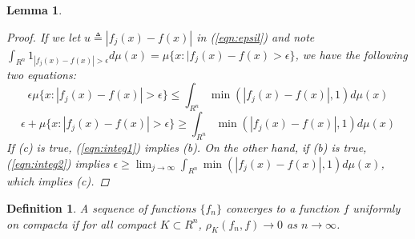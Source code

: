 \documentclass[12pt]{amsart}
\newtheorem{definition}{Definition}
\theoremstyle{plain}
\newtheorem{lemma}[thm]{Lemma}
\theoremstyle{definition}
\theoremstyle{remark}
\numberwithin{equation}{section}
\numberwithin{thm}{section}
\begin{document}
\begin{lemma}
\begin{proof}
If we let $u \triangleq |f_j(x)-f(x)|$ in (\ref{eqn:epsil}) and note $
    \int_{R^n}1_{|f_j(x)-f(x)| > \epsilon} d\mu(x) = \mu\{ x: |f_j(x)-f(x) > \epsilon \}$, we have the following two equations: 
\begin{equation}
    \epsilon\mu \{ x: |f_j(x)-f(x)| > \epsilon \}  \leq \int_{R^n} \min(|f_j(x)-f(x)|,1)d\mu(x) \label{eqn:integ1} 
\end{equation}
\begin{equation}
       \epsilon + \mu \{ x: |f_j(x)-f(x)| > \epsilon \} \geq  \int_{R^n} \min(|f_j(x)-f(x)|,1) d\mu(x) \label{eqn:integ2} 
\end{equation}
If (c) is true, (\ref{eqn:integ1}) implies (b).
On the other hand, if (b) is true, (\ref{eqn:integ2}) implies $\epsilon \geq \lim_{j \to \infty} \int_{R^n} \min(|f_j(x)-f(x)|,1)d\mu(x)$, which implies (c).
\end{proof} 
\end{lemma}


\begin{definition}
    A sequence of functions $\{f_n\}$ converges to a function $f$ uniformly on compacta if for all compact $K \subset R^n$, $\rho_K(f_n,f) \to 0$ as $n \to \infty$.
\end{definition}
\end{document}
